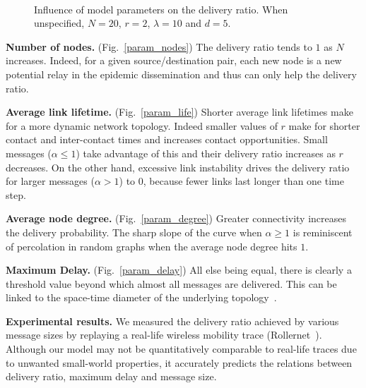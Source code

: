\documentclass{sig-alt-release2}
\begin{document}
\begin{figure}[t]
  \centering
   \\
  \caption{Influence of model parameters on the delivery ratio. When unspecified, $N=20$, $r=2$,
    $\lambda=10$ and $d=5$.}
  \label{params_influence}
\end{figure}

\vspace{1mm}
\noindent\textbf{Number of nodes.}
(Fig.~\ref{param_nodes}) The delivery ratio tends to $1$ as $N$
increases. Indeed, for a given source/destination pair, each new node
is a new potential relay in the epidemic dissemination and thus can
only help the delivery ratio.

\vspace{1mm}
\noindent\textbf{Average link lifetime.}
(Fig.~\ref{param_life}) Shorter average link lifetimes make for a more
dynamic network topology. Indeed smaller values of $r$ make for
shorter contact and inter-contact times and increases contact
opportunities. Small messages ($\alpha \le 1$) take advantage of this
and their delivery ratio increases as $r$ decreases. On the other
hand, excessive link instability drives the delivery ratio for larger
messages ($\alpha > 1$) to 0, because fewer links last longer than one
time step.

\vspace{1mm}
\noindent\textbf{Average node degree.}
(Fig.~\ref{param_degree}) Greater connectivity increases the delivery
probability. The sharp slope of the curve when $\alpha \ge 1$ is
reminiscent of percolation in random graphs when the average node
degree hits $1$.

\vspace{1mm}
\noindent\textbf{Maximum Delay.} (Fig.~\ref{param_delay})
All else being equal, there is clearly a threshold value beyond which
almost all messages are delivered. This can be linked to the space-time
diameter of the underlying topology~\cite{chaintreau_diam}.

\vspace{1mm}
\noindent\textbf{Experimental results.} 
We measured the delivery ratio achieved by various message sizes by
replaying a real-life wireless mobility trace
(Rollernet~\cite{tournoux08_rollernet}). Although our model may not be
quantitatively comparable to real-life traces due to unwanted
small-world properties, it accurately predicts the relations between
delivery ratio, maximum delay and message size.
\end{document}
